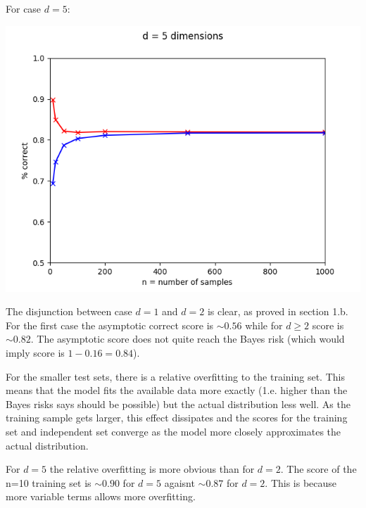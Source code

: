 \documentclass{article}
\begin{document}
\pagebreak
For case $d = 5$:

\begin{center}\includegraphics[scale=0.8]{dequals5}\end{center}


The disjunction between case $d=1$ and $d=2$ is  clear, as proved in section 1.b. For the first case the asymptotic correct score is $\sim0.56$ while for $ d\geq2$ score is $\sim0.82$. The asymptotic score does not quite reach the Bayes risk (which would imply score is $1-0.16=0.84$). 

For the smaller test sets, there is a relative overfitting to the training set. This means that the model fits the available data more exactly (1.e. higher than the Bayes risks says should be possible) but the actual distribution less well. As the training sample gets larger, this effect dissipates and the scores for the training set and independent set converge as the model more closely approximates the actual distribution. 

For $d=5$ the relative overfitting is more obvious than for $d=2$. The score of the n=10 training set is $\sim0.90$ for $d=5$ agaisnt $\sim0.87$ for $d=2$. This is because more variable terms allows more overfitting. 
\end{document}
